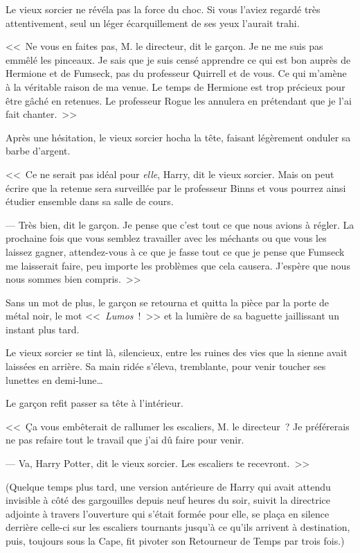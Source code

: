 Le vieux sorcier ne révéla pas la force du choc. Si vous l'aviez regardé très attentivement, seul un léger écarquillement de ses yeux l'aurait trahi.

<<~Ne vous en faites pas, M. le directeur, dit le garçon. Je ne me suis pas emmêlé les pinceaux. Je sais que je suis censé apprendre ce qui est bon auprès de Hermione et de Fumseck, pas du professeur Quirrell et de vous. Ce qui m'amène à la véritable raison de ma venue. Le temps de Hermione est trop précieux pour être gâché en retenues. Le professeur Rogue les annulera en prétendant que je l'ai fait chanter.~>>

Après une hésitation, le vieux sorcier hocha la tête, faisant légèrement onduler sa barbe d'argent.

<<~Ce ne serait pas idéal pour \emph{elle}, Harry, dit le vieux sorcier. Mais on peut écrire que la retenue sera surveillée par le professeur Binns et vous pourrez ainsi étudier ensemble dans sa salle de cours.

--- Très bien, dit le garçon. Je pense que c'est tout ce que nous avions à régler. La prochaine fois que vous semblez travailler avec les méchants ou que vous les laissez gagner, attendez-vous à ce que je fasse tout ce que je pense que Fumseck me laisserait faire, peu importe les problèmes que cela causera. J'espère que nous nous sommes bien compris.~>>

Sans un mot de plus, le garçon se retourna et quitta la pièce par la porte de métal noir, le mot <<~\emph{Lumos}~!~>> et la lumière de sa baguette jaillissant un instant plus tard.

Le vieux sorcier se tint là, silencieux, entre les ruines des vies que la sienne avait laissées en arrière. Sa main ridée s'éleva, tremblante, pour venir toucher ses lunettes en demi-lune…

Le garçon refit passer sa tête à l'intérieur.

<<~Ça vous embêterait de rallumer les escaliers, M. le directeur~? Je préférerais ne pas refaire tout le travail que j'ai dû faire pour venir.

--- Va, Harry Potter, dit le vieux sorcier. Les escaliers te recevront.~>>

(Quelque temps plus tard, une version antérieure de Harry qui avait attendu invisible à côté des gargouilles depuis neuf heures du soir, suivit la directrice adjointe à travers l'ouverture qui s'était formée pour elle, se plaça en silence derrière celle-ci sur les escaliers tournants jusqu'à ce qu'ils arrivent à destination, puis, toujours sous la Cape, fit pivoter son Retourneur de Temps par trois fois.)

